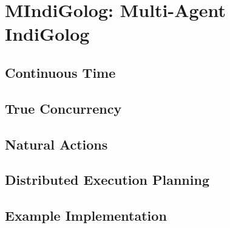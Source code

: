\chapter{MIndiGolog: Multi-Agent IndiGolog}\label{ch:mindigolog}
\minitoc
\onehalfspace   %


\section{Continuous Time}

\section{True Concurrency}

\section{Natural Actions}

\section{Distributed Execution Planning}
\cite{kelly06hlp_dps}

\section{Example Implementation}


